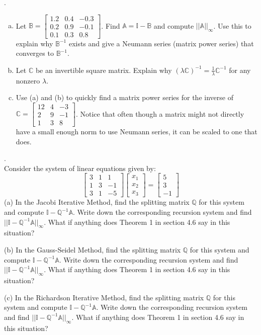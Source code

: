 \documentclass[12 pt]{article}
\begin{document}
. 
\begin{enumerate}[a)]
  \item 
Let $\mathbb{B}= \begin{bmatrix} 1.2 & 0.4 & -0.3 \\ 0.2 & 0.9 & -0.1 \\ 0.1 &
0.3 & 0.8 \end{bmatrix}$.
Find $\mathbb{A}=\mathbb{I} - \mathbb{B}$ and compute $||\mathbb{A}||_{\infty}$. 
Use this to explain why $\mathbb{B}^{-1}$ exists and give a Neumann series (matrix power series) that converges to $\mathbb{B}^{-1}$. 

\noindent
\item
Let $\mathbb{C}$ be an invertible square matrix. Explain why $(\lambda \mathbb{C})^{-1} = \frac{1}{\lambda} \mathbb{C}^{-1}$ for any nonzero 
$\lambda$. 

\noindent
\item Use (a) and (b) to quickly find a matrix power series for the inverse of
$\mathbb{C}=\begin{bmatrix} 12 & 4 & -3 \\ 2 & 9 & -1 \\ 1 & 3 & 8 \end{bmatrix}$. Notice that often though a matrix might not directly have a small enough norm to use Neumann series, it can be scaled to one that does.

\end{enumerate}
\medskip

. \\
Consider the system of linear equations given by:
$$
\begin{bmatrix} 3 & 1 & 1 \\ 1 & 3 & -1 \\ 3 & 1 & -5 \end{bmatrix}
\begin{bmatrix} x_1 \\ x_2 \\ x_3 \end{bmatrix}
=
\begin{bmatrix} 5 \\ 3 \\ -1 \end{bmatrix}
$$
(a) In the Jacobi Iterative Method, find the splitting matrix $\mathbb{Q}$ for this system and compute 
$\mathbb{I} - \mathbb{Q}^{-1} \mathbb{A}$. Write down the corresponding recursion system and 
find $|| \mathbb{I}-\mathbb{Q}^{-1}\mathbb{A}||_{\infty}$. What if anything does Theorem 1 in section 4.6 say in this situation? 

\noindent
(b) In the Gauss-Seidel Method, find the splitting matrix $\mathbb{Q}$ for this system and compute 
$\mathbb{I} - \mathbb{Q}^{-1} \mathbb{A}$. Write down the corresponding recursion system and 
find $|| \mathbb{I}-\mathbb{Q}^{-1}\mathbb{A}||_{\infty}$. What if anything does Theorem 1 in section 4.6 say in this situation?

\noindent
(c) In the Richardson Iterative Method, find the splitting matrix $\mathbb{Q}$ for this system and compute 
$\mathbb{I} - \mathbb{Q}^{-1} \mathbb{A}$. Write down the corresponding recursion system and 
find $|| \mathbb{I}-\mathbb{Q}^{-1}\mathbb{A}||_{\infty}$. What if anything does Theorem 1 in section 4.6 say in this situation?
\end{document}
